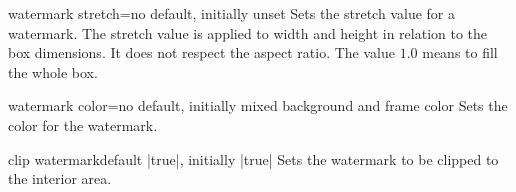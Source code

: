 \clearpage
\begin{docTcbKey}{watermark stretch}{=}{no default, initially unset}
  Sets the stretch value for a watermark. The stretch value is applied to width
  and height in relation to the box dimensions. It does not respect the aspect ratio.
  The value $1.0$ means to fill the whole box.
\begin{dispExample}

\begin{tcolorbox}[title=Stretch 1.00,watermark stretch=1.00]
\lipsum[2]
\end{tcolorbox}\hfill%
\begin{tcolorbox}[title=Stretch 0.50,watermark stretch=0.50]
\lipsum[2]
\end{tcolorbox}%
\end{dispExample}
\end{docTcbKey}

\begin{docTcbKey}{watermark color}{=}{no default, initially mixed background and frame color}
  Sets the color for the watermark.
\begin{dispExample}

\begin{tcolorbox}[enhanced,title=My title,watermark text=My Watermark,
  watermark color=yellow!50!red]
\lipsum[1]
\end{tcolorbox}
\end{dispExample}
\end{docTcbKey}

\clearpage

\begin{docTcbKey}{clip watermark}{}{default |true|, initially |true|}
  Sets the watermark to be clipped to the interior area.
\begin{dispExample}

\begin{tcolorbox}[title=Clip (default),clip watermark]
\lipsum[1]
\end{tcolorbox}

\begin{tcolorbox}[title=No clip,clip watermark=false]
\lipsum[1]
\end{tcolorbox}%
\end{dispExample}
\end{docTcbKey}



